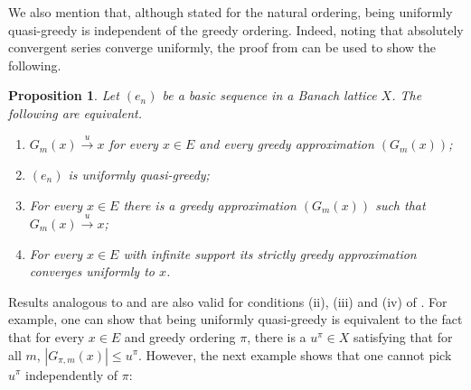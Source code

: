 \documentclass[12pt,leqno]{amsart}
\newtheorem{proposition}[theorem]{Proposition}
\numberwithin{equation}{section}
\theoremstyle{definition}
\newtheorem{question}[theorem]{Question}
\begin{document}




We also mention that, although stated for the natural ordering, being uniformly quasi-greedy is independent of the greedy ordering. Indeed, noting that absolutely convergent series converge uniformly, the proof from \cite[Lemma 10.2.5]{AK16} can be used to show the following.

\begin{proposition}\label{U-independ}
Let $(e_n)$ be a basic sequence in a Banach lattice $X$. The following are equivalent.
\begin{enumerate}
\item $G_m(x)\xrightarrow{u}x$ for every $x\in E$ and every greedy approximation $(G_m(x))$;
\item $(e_n)$ is uniformly quasi-greedy;
\item For every $x\in E$ there is a greedy approximation $(G_m(x))$ such that $G_m(x)\xrightarrow{u}x$;
\item For every $x\in E$ with infinite support its strictly greedy approximation converges uniformly to $x$.

\end{enumerate}
\end{proposition}
Results analogous to  and  are also valid for conditions (ii), (iii) and (iv) of . For example, one can show that being uniformly quasi-greedy is equivalent to the fact that for every $x\in E$ and greedy ordering $\pi$, there is a $u^\pi\in X$ satisfying that for all $m$, $|G_{\pi,m}(x)|\leq u^\pi$. However, the next example shows that one cannot pick $u^\pi$ independently of $\pi$:
\end{document}
